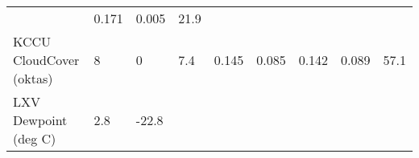\documentclass[11pt]{article}
\begin{document}
\begin{longtable}[]{@{}lllllllll@{}}
\begin{minipage}[t]{0.07\columnwidth}
\end{minipage} & \begin{minipage}[t]{0.06\columnwidth}\raggedright\strut
0.171\strut
\end{minipage} & \begin{minipage}[t]{0.06\columnwidth}\raggedright\strut
0.005\strut
\end{minipage} & \begin{minipage}[t]{0.07\columnwidth}\raggedright\strut
21.9\strut
\end{minipage}\tabularnewline
\begin{minipage}[t]{0.25\columnwidth}\raggedright\strut
KCCU CloudCover (oktas)\strut
\end{minipage} & \begin{minipage}[t]{0.06\columnwidth}\raggedright\strut
8\strut
\end{minipage} & \begin{minipage}[t]{0.06\columnwidth}\raggedright\strut
0\strut
\end{minipage} & \begin{minipage}[t]{0.08\columnwidth}\raggedright\strut
7.4\strut
\end{minipage} & \begin{minipage}[t]{0.05\columnwidth}\raggedright\strut
0.145\strut
\end{minipage} & \begin{minipage}[t]{0.07\columnwidth}\raggedright\strut
0.085\strut
\end{minipage} & \begin{minipage}[t]{0.06\columnwidth}\raggedright\strut
0.142\strut
\end{minipage} & \begin{minipage}[t]{0.06\columnwidth}\raggedright\strut
0.089\strut
\end{minipage} & \begin{minipage}[t]{0.07\columnwidth}\raggedright\strut
57.1\strut
\end{minipage}\tabularnewline
\begin{minipage}[t]{0.25\columnwidth}\raggedright\strut
LXV Dewpoint (deg C)\strut
\end{minipage} & \begin{minipage}[t]{0.06\columnwidth}\raggedright\strut
2.8\strut
\end{minipage} & \begin{minipage}[t]{0.06\columnwidth}\raggedright\strut
-22.8\strut
\end{minipage} & \begin{minipage}[t]{0.08\columnwidth}\raggedright\strut

\end{minipage}
\end{longtable}
\end{document}
